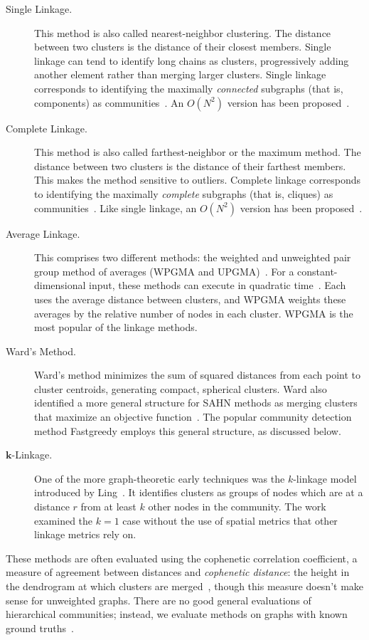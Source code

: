 \begin{description}

\item[Single Linkage.] This method is also called nearest-neighbor clustering. The distance between two clusters is the distance of their closest members. Single linkage can tend to identify long chains as clusters, progressively adding another element rather than merging larger clusters. Single linkage corresponds to identifying the maximally \emph{connected} subgraphs (that is, components) as communities~\cite{xu2008clustering}. An $O(N^2)$ version has been proposed~\cite{sibson1973slink}.

\item[Complete Linkage.] This method is also called farthest-neighbor or the maximum method. The distance between two clusters is the distance of their farthest members. This makes the method sensitive to outliers. Complete linkage corresponds to identifying the maximally \emph{complete} subgraphs (that is, cliques) as communities~\cite{xu2008clustering}. Like single linkage, an $O(N^2)$ version has been proposed~\cite{defays1977efficient}.

\item[Average Linkage.] This comprises two different methods: the weighted and unweighted pair group method of averages (WPGMA and UPGMA)~\cite{sneath1962numerical}. For a constant-dimensional input, these methods can execute in quadratic time~\cite{murtagh1984complexities}. Each uses the average distance between clusters, and WPGMA weights these averages by the relative number of nodes in each cluster. WPGMA is the most popular of the linkage methods.

\item[Ward's Method.] Ward's method minimizes the sum of squared distances from each point to cluster centroids, generating compact, spherical clusters. Ward also identified a more general structure for SAHN methods as merging clusters that maximize an objective function~\cite{ward1963hierarchical}. The popular community detection method Fastgreedy employs this general structure, as discussed below.

\item[$\mathbf{k}$-Linkage.] One of the more graph-theoretic early techniques was the $k$-linkage model introduced by Ling~\cite{ling1973probability}. It identifies clusters as groups of nodes which are at a distance $r$ from at least $k$ other nodes in the community. The work examined the $k=1$ case without the use of spatial metrics that other linkage metrics rely on.

\end{description}
These methods are often evaluated using the cophenetic correlation coefficient, a measure of agreement between distances and \emph{cophenetic distance}: the height in the dendrogram at which clusters are merged~\cite{sokal1962comparison, rohlf1968tests}, though this measure doesn't make sense for unweighted graphs. There are no good general evaluations of hierarchical communities; instead, we evaluate methods on graphs with known ground truths~\cite{lancichinetti2009detecting}.

